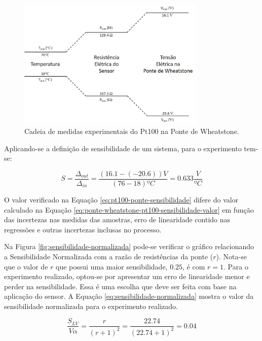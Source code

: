 \documentclass[a4paper]{instrumentacao}
\begin{document}
\begin{figure}[H]
\center
\includegraphics[width=0.8\textwidth]{cadeia_medidas_pt100_ponte.jpg}
\caption{Cadeia de medidas experimentais do Pt100 na Ponte de Wheatstone.}
\label{fig:pt100-cadeia-medidas-ponte}
\end{figure}

Aplicando-se a definição de sensibilidade de um sistema, para o experimento tem-se:

\begin{equation}
	S=\frac{\Delta_{out}}{\Delta_{in}}=\frac{(16.1-(-20.6))V}{(76-18) ºC}=0.633 \frac{V}{ºC}
	\label{eq:pt100-ponte-sensibilidade}
\end{equation}

O valor verificado na Equação \ref{eq:pt100-ponte-sensibilidade} difere do valor calculado na Equação \ref{eq:ponte-wheatstone-pt100-sensibilidade-valor} em função das incertezas nas medidas das amostras, erro de linearidade contido nas regressões e outras incertezas inclusas no processo.

Na Figura \ref{fig:sensibilidade-normalizada} pode-se verificar o gráfico relacionando a Sensibilidade Normalizada com a razão de resistências da ponte ($r$). Nota-se que o valor de $r$ que possui uma maior sensibilidade, $0.25$, é com $r=1$. Para o experimento realizado, optou-se por apresentar um erro de linearidade menor e perder na sensibilidade. Essa é uma escolha que deve ser feita com base na aplicação do sensor. A Equação \ref{eq:sensibilidade-normalizada} mostra o valor da sensibilidade normalizada para o experimento realizado.

\begin{equation}
	\frac{S_{LV}}{V\alpha}=\frac{r}{(r+1)^2}=\frac{22.74}{(22.74+1)^2}=0.04
	\label{eq:sensibilidade-normalizada}
\end{equation}
\end{document}
